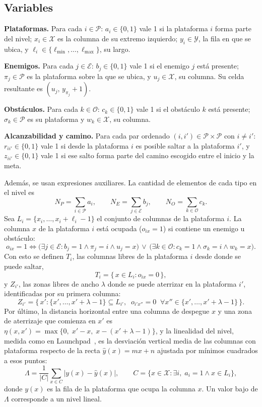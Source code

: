 \documentclass[letter, 10pt]{article}
\begin{document}
\subsection{Variables}

\textbf{Plataformas.} Para cada $i \in \mathcal{P}$: $a_i \in \{0,1\}$ vale 1 si la plataforma $i$ forma parte del nivel; $x_i \in \mathcal{X}$ es la columna de su extremo izquierdo; $y_i \in \mathcal{Y}$, la fila en que se ubica, y $\ell_i \in \{\ell_{\min},\dots,\ell_{\max}\}$, su largo.

\textbf{Enemigos.} Para cada $j \in \mathcal{E}$: $b_j \in \{0,1\}$ vale 1 si el enemigo $j$ est\'a presente; $\pi_j \in \mathcal{P}$ es la plataforma sobre la que se ubica, y $u_j \in \mathcal{X}$, su columna. Su celda resultante es $(u_j,\, y_{\pi_j}+1)$.

\textbf{Obst\'aculos.} Para cada $k \in \mathcal{O}$: $c_k \in \{0,1\}$ vale 1 si el obst\'aculo $k$ est\'a presente; $\sigma_k \in \mathcal{P}$ es su plataforma y $w_k \in \mathcal{X}$, su columna.

\textbf{Alcanzabilidad y camino.} Para cada par ordenado $(i,i') \in \mathcal{P}\times\mathcal{P}$ con $i \neq i'$: $r_{ii'} \in \{0,1\}$ vale 1 si desde la plataforma $i$ es posible saltar a la plataforma $i'$, y $z_{ii'} \in \{0,1\}$ vale 1 si ese salto forma parte del camino escogido entre el inicio y la meta.

Adem\'as, se usan expresiones auxiliares. La cantidad de elementos de cada tipo en el nivel es
\[
N_P = \sum_{i\in\mathcal{P}} a_i, \qquad N_E = \sum_{j\in\mathcal{E}} b_j, \qquad N_O = \sum_{k\in\mathcal{O}} c_k.
\]
Sea $L_i = \{x_i,\dots,x_i+\ell_i-1\}$ el conjunto de columnas de la plataforma $i$. La columna $x$ de la plataforma $i$ est\'a ocupada ($o_{ix}=1$) si contiene un enemigo u obst\'aculo:
\[
o_{ix} = 1 \iff \big(\exists j \in \mathcal{E}: b_j = 1 \wedge \pi_j = i \wedge u_j = x\big) \,\vee\, \big(\exists k \in \mathcal{O}: c_k = 1 \wedge \sigma_k = i \wedge w_k = x\big).
\]
Con esto se definen $T_i$, las columnas libres de la plataforma $i$ desde donde se puede saltar,
\[
T_i = \{\, x \in L_i : o_{ix} = 0 \,\},
\]
y $Z_{i'}$, las zonas libres de ancho $\lambda$ donde se puede aterrizar en la plataforma $i'$, identificadas por su primera columna:
\[
Z_{i'} = \{\, x' : \{x',\dots,x'+\lambda-1\} \subseteq L_{i'},\;\; o_{i'x''} = 0 \;\; \forall x'' \in \{x',\dots,x'+\lambda-1\} \,\}.
\]
Por \'ultimo, la distancia horizontal entre una columna de despegue $x$ y una zona de aterrizaje que comienza en $x'$ es $\eta(x,x') = \max\{0,\; x' - x,\; x - (x'+\lambda-1)\}$, y la linealidad del nivel, medida como en Launchpad~\cite{Smith2011}, es la desviaci\'on vertical media de las columnas con plataforma respecto de la recta $\hat{y}(x) = mx + n$ ajustada por m\'inimos cuadrados a esos puntos:
\[
\Lambda = \frac{1}{|C|}\sum_{x\in C} \left| y(x) - \hat{y}(x) \right|, \qquad C = \{x \in \mathcal{X} : \exists i,\; a_i = 1 \wedge x \in L_i\},
\]
donde $y(x)$ es la fila de la plataforma que ocupa la columna $x$. Un valor bajo de $\Lambda$ corresponde a un nivel lineal.
\end{document}
